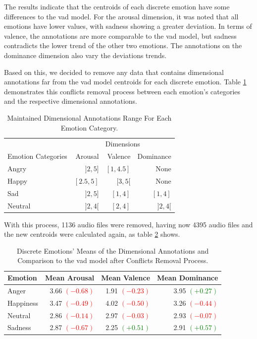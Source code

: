 The results indicate that the centroids of each discrete emotion have some differences to the \ac{vad} model. For the arousal dimension, it was noted that all emotions have lower values, with sadness showing a greater deviation. In terms of valence, the annotations are more comparable to the \ac{vad} model, but sadness contradicts the lower trend of the other two emotions. The annotations on the dominance dimension also vary the deviations trends.

Based on this, we decided to remove any data that contains dimensional annotations far from the \ac{vad} model centroids for each discrete emotion. Table \ref{tab:conf} demonstrates this conflicts removal process between each emotion's categories and the respective dimensional annotations.

\begin{table}[H]
\caption{Maintained Dimensional Annotations Range For Each Emotion Category.}
\label{tab:conf}
\centering
    \begin{tabular}{lrrr}
        \toprule
        {} & \multicolumn{3}{c}{Dimensions} \\ \cmidrule{2-4}
        Emotion Categories &    Arousal &      Valence &       Dominance \\
        \midrule
        Angry   &   $]2, 5]$  	& $[1, 4.5]$ 	&  None 		\\
        Happy 	&   $[2.5, 5]$  & $[3, 5[$ 		&  None 		\\
        Sad    	&   $]2, 5]$ 	& $[1, 4]$ 		&  $[1, 4]$ 	\\
        Neutral &   $]2, 4[$	& $[2, 4]$ 		&  $]2, 4[$		\\
        \bottomrule
    \end{tabular}
\end{table}


With this process, 1136 audio files were removed, having now 4395 audio files and the new centroids were calculated again, as table \ref{tab:new_c} shows.


\begin{table}[H]
	\centering
	\caption{Discrete Emotions' Means of the Dimensional Annotations and Comparison to the \ac{vad} model after Conflicts Removal Process.}
	\label{tab:new_c}
	\begin{tabular}{lrrr}
		\toprule
		Emotion & Mean Arousal &   Mean Valence & Mean Dominance \\
		\midrule
		Anger   	&   3.66 \textcolor{red}{$(-0.68)$} &  1.91 \textcolor{red}{$(-0.23)$} &  3.95 \textcolor{green}{$(+0.27)$} \\
		Happiness   &   3.47 \textcolor{red}{$(-0.49)$} &  4.02 \textcolor{red}{$(-0.50)$} &  3.26 \textcolor{red}{$(-0.44)$} \\
		Neutral 	&   2.86 \textcolor{red}{$(-0.14)$} &  2.97 \textcolor{red}{$(-0.03)$} &  2.93 \textcolor{red}{$(-0.07)$} \\
		Sadness     &   2.87 \textcolor{red}{$(-0.67)$} &  2.25 \textcolor{green}{$(+0.51)$} &  2.91 \textcolor{green}{$(+0.57)$} \\
		\bottomrule
	\end{tabular}
\end{table}


